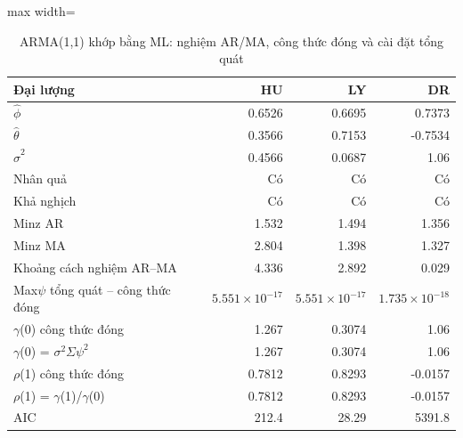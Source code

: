 \begin{table}[H]
\centering\small
\caption{ARMA(1,1) khớp bằng ML: nghiệm AR/MA, công thức đóng và cài đặt tổng quát}\label{tab:tab_b11_10_arma11}
\begin{adjustbox}{max width=\linewidth}
\begin{tabular}{lrrr}
\toprule
Đại lượng & HU & LY & DR \\
\midrule
$\hat{\phi}$ & 0.6526 & 0.6695 & 0.7373 \\
$\hat{\theta}$ & 0.3566 & 0.7153 & -0.7534 \\
$\hat{\sigma}^{2}$ & 0.4566 & 0.0687 & 1.06 \\
Nhân quả & Có & Có & Có \\
Khả nghịch & Có & Có & Có \\
Min\textbar{}z\textbar{} AR & 1.532 & 1.494 & 1.356 \\
Min\textbar{}z\textbar{} MA & 2.804 & 1.398 & 1.327 \\
Khoảng cách nghiệm AR–MA & 4.336 & 2.892 & 0.029 \\
Max\textbar{}$\psi$ tổng quát – công thức đóng\textbar{} & $5.551\times10^{-17}$ & $5.551\times10^{-17}$ & $1.735\times10^{-18}$ \\
$\gamma$(0) công thức đóng & 1.267 & 0.3074 & 1.06 \\
$\gamma$(0) = $\sigma^{2}\Sigma\psi^{2}$ & 1.267 & 0.3074 & 1.06 \\
$\rho$(1) công thức đóng & 0.7812 & 0.8293 & -0.0157 \\
$\rho$(1) = $\gamma$(1)/$\gamma$(0) & 0.7812 & 0.8293 & -0.0157 \\
AIC & 212.4 & 28.29 & 5391.8 \\
\bottomrule
\end{tabular}
\end{adjustbox}
\end{table}
